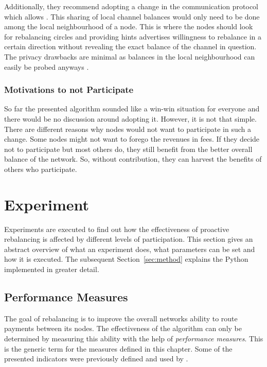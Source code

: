\documentclass[final]{fhnwreport}       %
\begin{document}
Additionally, they recommend adopting a change in the communication protocol which allows . This sharing of local channel balances would only need to be done among the local neighbourhood of a node. This is where the nodes should look for rebalancing circles and providing hints advertises willingness to rebalance in a certain direction without revealing the exact balance of the channel in question. The privacy drawbacks are minimal as balances in the local neighbourhood can easily be probed anyways \citep{tikhomirov_probing_2020}. 
 
\subsubsection{Motivations to not Participate}
So far the presented algorithm sounded like a win-win situation for everyone and there would be no discussion around adopting it. However, it is not that simple. There are different reasons why nodes would not want to participate in such a change. Some nodes might not want to forego the revenues in fees. If they decide not to participate but most others do, they still benefit from the better overall balance of the network. So, without contribution, they can harvest the benefits of others who participate. 

\newpage
\section{Experiment}\label{sec:experiment}
Experiments are executed to find out how the effectiveness of proactive rebalancing is affected by different levels of participation. This section gives an abstract overview of what an experiment does, what parameters can be set and how it is executed. The subsequent Section~\ref{sec:method} explains the Python implemented in greater detail.

\subsection{Performance Measures}\label{sub:perfm}
The goal of rebalancing is to improve the overall networks ability to route payments between its nodes. The effectiveness of the algorithm can only be determined by measuring this ability with the help of \emph{performance measures}. This is the generic term for the measures defined in this chapter. Some of the presented indicators were previously defined and used by \textcite{pickhardt_evaluating_2020}. 
\end{document}

